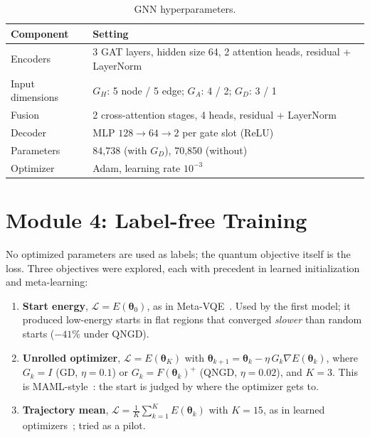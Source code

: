 \documentclass{ssnreview}
\begin{document}
\begin{table}[H]
\centering
\caption{GNN hyperparameters.}\label{tab:hyper}
\begin{tabularx}{\textwidth}{L{3.2cm}Y}
\toprule
Component & Setting \\
\midrule
Encoders & 3 GAT layers, hidden size 64, 2 attention heads, residual + LayerNorm \\
Input dimensions & $G_H$: 5 node / 5 edge; $G_A$: 4 / 2; $G_D$: 3 / 1 \\
Fusion & 2 cross-attention stages, 4 heads, residual + LayerNorm \\
Decoder & MLP $128\to64\to2$ per gate slot (ReLU) \\
Parameters & 84{,}738 (with $G_D$), 70{,}850 (without) \\
Optimizer & Adam, learning rate $10^{-3}$ \\
\bottomrule
\end{tabularx}
\end{table}

\section{Module 4: Label-free Training}

No optimized parameters are used as labels; the quantum objective itself is the loss. Three
objectives were explored, each with precedent in learned initialization and meta-learning:
\begin{enumerate}[label=(\alph*)]
  \item \textbf{Start energy}, $\mathcal{L}=E(\boldsymbol\theta_0)$, as in
        Meta-VQE~\cite{metavqe}. Used by the first model; it produced low-energy starts in flat
        regions that converged \emph{slower} than random starts ($-41\%$ under QNGD).
  \item \textbf{Unrolled optimizer}, $\mathcal{L}=E(\boldsymbol\theta_K)$ with
        $\boldsymbol\theta_{k+1}=\boldsymbol\theta_k-\eta\,G_k\nabla E(\boldsymbol\theta_k)$, where
        $G_k=I$ (GD, $\eta=0.1$) or $G_k=F(\boldsymbol\theta_k)^{+}$ (QNGD, $\eta=0.02$), and
        $K=3$. This is MAML-style~\cite{maml}: the start is judged by where the optimizer gets
        to.
  \item \textbf{Trajectory mean}, $\mathcal{L}=\tfrac1K\sum_{k=1}^K E(\boldsymbol\theta_k)$ with
        $K=15$, as in learned optimizers~\cite{andrychowicz2016,verdon2019}; tried as a pilot.
\end{enumerate}
\end{document}
